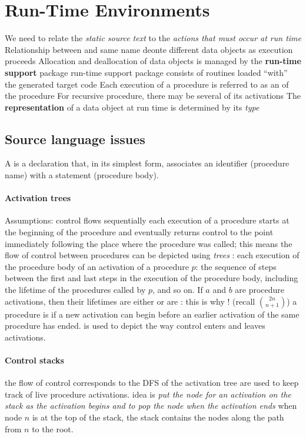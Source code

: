 \documentclass{myart}
\begin{document}
\section{Run-Time Environments}
\bit
\w We need to relate the {\em static source text\/} to the {\em
	actions	that must occur at run time\/}
\w Relationship between  and 
	\bit
	\w same name deonte different data objects as execution proceeds
	\eit
\w Allocation and deallocation of data objects is managed by the {\bf
	run-time support\/} package
	\bit
	\w run-time support package consists of routines loaded ``with''
		the generated target code
	\eit
\w Each execution of a procedure is referred to as an 
	of the procedure
	\bit
	\w For recursive procedure, there may be several of its
		activations
	\eit
\w The {\bf representation\/} of a data object at run time is
	determined
	by its {\em type\/}
\eit
\subsection{Source language issues}
\bit
\w A  is a declaration that, in its simplest
	form, associates an identifier (procedure name) with a 
	statement (procedure body).
\eit
\paragraph{Activation trees}
	\bit
	\w Assumptions: 
		\bit
		\w control flows sequentially
		\w each execution of a procedure starts at the
beginning of
		the procedure and eventually returns control to the
point immediately following the place where the procedure was called;
	this means the flow of control between procedures can be
depicted
using {\em trees\/}
		\eit
	\w {}: each execution of the
procedure body
	\w {} of an activation of a procedure $p$:
	the sequence of steps between the first and last steps in the
execution of the procedure body, including the lifetime of the 
procedures called by $p$, and so on.
	\w If $a$ and $b$ are procedure activations, then their
	lifetimes are either  or are :
		this is why ! (recall $2n \choose n+1$)
	\w a procedure is  if a new activation can begin
	before an earlier activation of the same procedure has ended.
	\w {} is used to depict the way control
	enters and leaves activations.
	\eit
\paragraph{Control stacks}
	\bit
	\w the flow of control corresponds to the DFS of the
activation tree
	\w {} are used to keep track of live
procedure activations.
	\w idea is {\em put the node for an activation on the stack 
	as the activation begins and to pop the node when the
activation ends\/}
	\w when node $n$ is at the top of the stack, the stack
contains the nodes along the path from $n$ to the root.
	\eit
\end{document}
